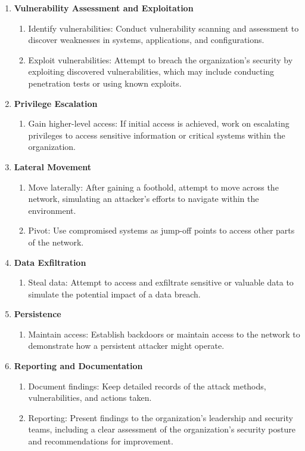 \begin{enumerate}
\item \textbf{Vulnerability Assessment and Exploitation}
\begin{enumerate}
\item Identify vulnerabilities: Conduct vulnerability scanning and assessment to discover weaknesses in systems, applications, and configurations.
\item Exploit vulnerabilities: Attempt to breach the organization's security by exploiting discovered vulnerabilities, which may include conducting penetration tests or using known exploits.
\end{enumerate}

\item \textbf{Privilege Escalation}
\begin{enumerate}
\item Gain higher-level access: If initial access is achieved, work on escalating privileges to access sensitive information or critical systems within the organization.
\end{enumerate}

\item \textbf{Lateral Movement}
\begin{enumerate}
\item Move laterally: After gaining a foothold, attempt to move across the network, simulating an attacker's efforts to navigate within the environment.
\item Pivot: Use compromised systems as jump-off points to access other parts of the network.
\end{enumerate}

\item \textbf{Data Exfiltration}
\begin{enumerate}
\item Steal data: Attempt to access and exfiltrate sensitive or valuable data to simulate the potential impact of a data breach.
\end{enumerate}

\item \textbf{Persistence}
\begin{enumerate}
\item Maintain access: Establish backdoors or maintain access to the network to demonstrate how a persistent attacker might operate.
\end{enumerate}

\item \textbf{Reporting and Documentation}
\begin{enumerate}
\item Document findings: Keep detailed records of the attack methods, vulnerabilities, and actions taken.
\item Reporting: Present findings to the organization's leadership and security teams, including a clear assessment of the organization's security posture and recommendations for improvement.
\end{enumerate}


\end{enumerate}
